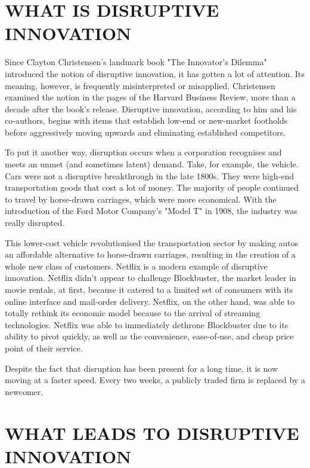 \documentclass{article}
\begin{document}
\section{WHAT IS DISRUPTIVE INNOVATION}

Since Clayton Christensen's landmark book "The Innovator's Dilemma" introduced the notion of disruptive innovation, it has gotten a lot of attention. Its meaning, however, is frequently misinterpreted or misapplied. Christensen examined the notion in the pages of the Harvard Business Review, more than a decade after the book's release. Disruptive innovation, according to him and his co-authors, begins with items that establish low-end or new-market footholds before aggressively moving upwards and eliminating established competitors.


To put it another way, disruption occurs when a corporation recognises and meets an unmet (and sometimes latent) demand. Take, for example, the vehicle. Cars were not a disruptive breakthrough in the late 1800s. They were high-end transportation goods that cost a lot of money. The majority of people continued to travel by horse-drawn carriages, which were more economical. With the introduction of the Ford Motor Company's "Model T" in 1908, the industry was really disrupted.


This lower-cost vehicle revolutionised the transportation sector by making autos an affordable alternative to horse-drawn carriages, resulting in the creation of a whole new class of customers. Netflix is a modern example of disruptive innovation. Netflix didn't appear to challenge Blockbuster, the market leader in movie rentals, at first, because it catered to a limited set of consumers with its online interface and mail-order delivery. Netflix, on the other hand, was able to totally rethink its economic model because to the arrival of streaming technologies. Netflix was able to immediately dethrone Blockbuster due to its ability to pivot quickly, as well as the convenience, ease-of-use, and cheap price point of their service.


Despite the fact that disruption has been present for a long time, it is now moving at a faster speed. Every two weeks, a publicly traded firm is replaced by a newcomer.

\section{WHAT LEADS TO DISRUPTIVE INNOVATION}
\end{document}
